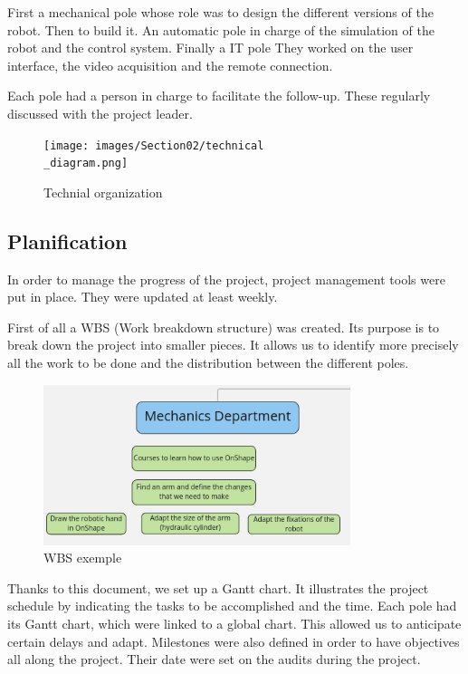 \bigbreak
First a mechanical pole whose role was to design the different versions of the robot. Then to build it. An automatic pole in charge of the simulation of the robot and the control system. Finally a IT pole They worked on the user interface, the video acquisition and the remote connection.

\bigbreak
Each pole had a person in charge to facilitate the follow-up. These regularly discussed with the project leader.

\begin{figure}[ht]
    \centering
    \texttt{[image: images/Section02/technical\\\_diagram.png]}
    \caption{Technial organization}
    \label{fig:mesh3}
\end{figure}
\FloatBarrier

\subsection{Planification}

\hspace{\parindent} In order to manage the progress of the project, project management tools were put in place. They were updated at least weekly.

\bigbreak
First of all a WBS (Work breakdown structure) was created. Its purpose is to break down the project into smaller pieces. It allows us to identify more precisely all the work to be done and the distribution between the different poles. 

\begin{figure}[ht]
    \centering
    \includegraphics[width=0.8\textwidth]{images/Section02/wbs.png}
    \caption{WBS exemple}
    \label{fig:mesh4}
\end{figure}
\FloatBarrier

\bigbreak
Thanks to this document, we set up a Gantt chart. It illustrates the project schedule by indicating the tasks to be accomplished and the time. Each pole had its Gantt chart, which were linked to a global chart. This allowed us to anticipate certain delays and adapt. Milestones were also defined in order to have objectives all along the project. Their date were set on the audits during the project.

